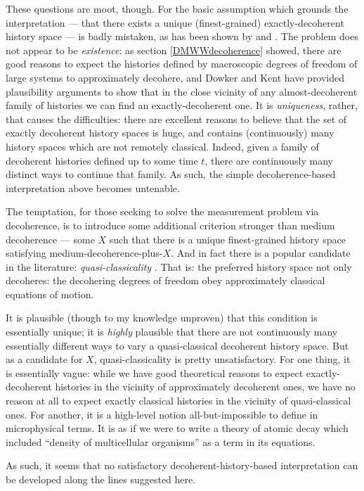 \documentclass[12pt]{article}
\begin{document}
These questions are moot, though. For the basic assumption which grounds the interpretation --- that there exists a unique (finest-grained) exactly-decoherent history space --- is badly mistaken, as has been shown by  and . The problem does not appear to be \emph{existence}: as section \ref{DMWWdecoherence} showed, there are good reasons to expect the histories defined by macroscopic degrees of freedom of large systems to approximately decohere, and Dowker and Kent have provided plausibility arguments to show that in the close vicinity of any almost-decoherent family of histories we can find an exactly-decoherent one. It is \emph{uniqueness}, rather, that causes the difficulties: there are excellent reasons to believe that the set of exactly decoherent history spaces is huge, and contains (continuously) many history spaces which are not remotely classical. Indeed, given a family of decoherent histories defined up to some time $t$, there are continuously many distinct ways to continue that family. As such, the simple decoherence-based interpretation above becomes untenable.

The temptation, for those seeking to solve the measurement problem via decoherence, is to introduce some additional criterion stronger than medium decoherence --- some $X$ such that there is a unique finest-grained history space satisfying medium-decoherence-plus-$X$.  And in fact there is a popular candidate in the literature: \emph{quasi-classicality} \cite{gellmannhartle93}. That is: the preferred history space not only decoheres: the decohering degrees of freedom obey approximately classical equations of motion.

It is plausible (though to my knowledge unproven) that this condition is essentially unique; it is \emph{highly} plausible that there are not continuously many essentially different ways to vary a quasi-classical decoherent history space. But as a candidate for $X$, quasi-classicality is pretty unsatisfactory. For one thing, it is essentially vague: while we have good theoretical reasons to expect exactly-decoherent histories in the vicinity of approximately decoherent ones, we have no reason at all to expect exactly classical histories in the vicinity of quasi-classical ones. For another, it is a high-level notion all-but-impossible to define in microphysical terms. It is as if we were to write a theory of atomic decay which included ``density of multicellular organisms'' as a term in its equations.

As such, it seems that no satisfactory decoherent-history-based interpretation can be developed along the lines suggested here.
\end{document}
